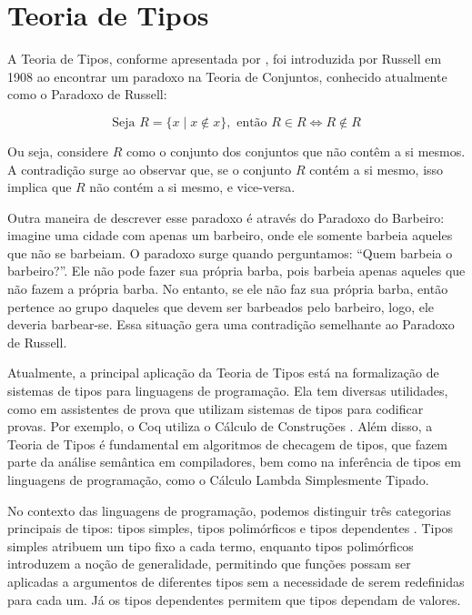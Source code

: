 \chapter{Teoria de Tipos} \label{ch:type-theory}

A Teoria de Tipos, conforme apresentada por \cite{COQUAND2022}, foi introduzida por Russell em 1908 ao encontrar um paradoxo na Teoria de Conjuntos, conhecido atualmente como o Paradoxo de Russell:

\begin{equation} \label{eq:russell-paradox}
  \text{Seja } R = \{ x \mid x \notin x \}, \text{ então } R \in R \iff R \notin R
\end{equation}

Ou seja, considere $R$ como o conjunto dos conjuntos que não contêm a si mesmos.
A contradição surge ao observar que, se o conjunto $R$ contém a si mesmo, isso implica que $R$ não contém a si mesmo, e vice-versa.

Outra maneira de descrever esse paradoxo é através do Paradoxo do Barbeiro: imagine uma cidade com apenas um barbeiro, onde ele somente barbeia aqueles que não se barbeiam.
O paradoxo surge quando perguntamos: ``Quem barbeia o barbeiro?''.
Ele não pode fazer sua própria barba, pois barbeia apenas aqueles que não fazem a própria barba.
No entanto, se ele não faz sua própria barba, então pertence ao grupo daqueles que devem ser barbeados pelo barbeiro, logo, ele deveria barbear-se.
Essa situação gera uma contradição semelhante ao Paradoxo de Russell.

Atualmente, a principal aplicação da Teoria de Tipos está na formalização de sistemas de tipos para linguagens de programação.
Ela tem diversas utilidades, como em assistentes de prova que utilizam sistemas de tipos para codificar provas.
Por exemplo, o Coq utiliza o Cálculo de Construções \cite{COQUAND1998}.
Além disso, a Teoria de Tipos é fundamental em algoritmos de checagem de tipos, que fazem parte da análise semântica em compiladores, bem como na inferência de tipos em linguagens de programação, como o Cálculo Lambda Simplesmente Tipado.

No contexto das linguagens de programação, podemos distinguir três categorias principais de tipos: tipos simples, tipos polimórficos e tipos dependentes \cite{PIERCE2002}.
Tipos simples atribuem um tipo fixo a cada termo, enquanto tipos polimórficos introduzem a noção de generalidade, permitindo que funções possam ser aplicadas a argumentos de diferentes tipos sem a necessidade de serem redefinidas para cada um.
Já os tipos dependentes permitem que tipos dependam de valores.

